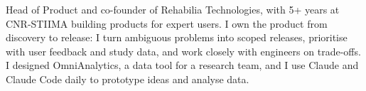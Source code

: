 {Head of Product and co-founder of Rehabilia Technologies, with 5+ years at CNR-STIIMA building products for expert users. I own the product from discovery to release: I turn ambiguous problems into scoped releases, prioritise with user feedback and study data, and work closely with engineers on trade-offs. I designed OmniAnalytics, a data tool for a research team, and I use Claude and Claude Code daily to prototype ideas and analyse data.}
